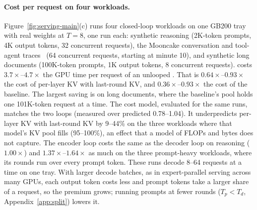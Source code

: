 \paragraph{Cost per request on four workloads.}
Figure~\ref{fig:serving-main}(c) runs four closed-loop workloads on one GB200 tray with real weights at $T=8$, one run
each:
synthetic reasoning (2K-token prompts, 4K output tokens, 32 concurrent requests), the Mooncake conversation and
tool-agent traces~\citep{mooncake} (64 concurrent requests, starting at minute 10), and synthetic long documents
(100K-token prompts, 1K output tokens, 8 concurrent requests). \ourmethod costs $3.7\times$--$4.7\times$ the GPU time
per request of an unlooped \ced. That is $0.64\times$--$0.93\times$ the cost of per-layer KV with last-round KV, and
$0.36\times$--$0.93\times$ the cost of the baseline. The largest saving is on long documents, where the baseline's pool
holds one 101K-token request at a time. The cost model, evaluated for the same runs, matches the two \ced loops
(measured over predicted 0.78--1.04). It underpredicts per-layer KV with last-round KV by 9--44\% on the three workloads
where that model's KV pool fills (95--100\%), an effect that a model of FLOPs and bytes does not capture. The encoder
loop costs the same as the decoder loop on reasoning ($1.00\times$) and $1.37\times$--$1.64\times$ as much on the three
prompt-heavy workloads, where its rounds run over every prompt token. These runs decode 8--64 requests at a time on one tray. With larger decode batches, as in
expert-parallel serving across many GPUs, each output token costs less and prompt tokens take a larger share of a
request, so the premium grows; running prompts at fewer rounds ($T_p<T_d$, Appendix~\ref{app:split}) lowers it.

